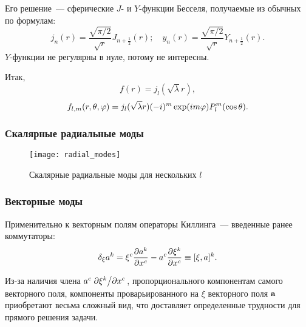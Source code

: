 \documentclass{beamer}
\begin{document}
    \begin{frame}

        Его решение~--- сферические $J$- и $Y$-функции Бесселя, получаемые из обычных по формулам:
        \begin{equation}
            j_n(r) = \frac{\sqrt{\pi/2}}{\sqrt{r}} J_{n+\frac{1}{2}}(r) ; \quad
            y_n(r) = \frac{\sqrt{\pi/2}}{\sqrt{r}} Y_{n+\frac{1}{2}}(r) .
        \end{equation}
        $Y$-функции не регулярны в нуле, потому не интересны.

        Итак,
        \begin{equation}
            f(r) = j_l(\sqrt{\lambda} r) ,
        \end{equation}
        \begin{equation}
            f_{l,m}(r,\theta,\varphi)
                = j_l(\sqrt{\lambda} r) (-i)^m \exp(i m \varphi) P^m_l\qty(\cos\theta) .
        \end{equation}

    \end{frame}


    \begin{frame}\frametitle{Скалярные радиальные моды}

        \begin{figure}[h]
            \centering
            \texttt{[image: radial\_modes]}
            \caption[]{Скалярные радиальные моды для нескольких $l$}
            \label{fig:radial_modes}
        \end{figure}

    \end{frame}


    \begin{frame}\frametitle{Векторные моды}

        Применительно к векторным полям операторы Киллинга~--- введенные ранее коммутаторы:
        \begin{equation}\label{eq:killing_operator}
            \delta_\xi a^k
                = \xi^c \pdv{a^k}{x^c} - a^c \pdv{\xi^k}{x^c}
                \equiv [\xi, a]^k .
        \end{equation}

        Из-за наличия члена $a^c \pdv*{\xi^k}{x^c}$, пропорционального компонентам самого векторного поля, компоненты проварьированного на $\xi$ векторного поля $\vb{a}$ приобретают весьма сложный вид, что доставляет определенные трудности для прямого решения задачи.

    \end{frame}
\end{document}
